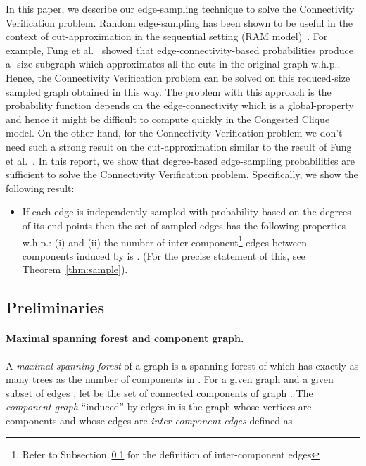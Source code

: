 \documentclass[11pt]{article}
\begin{document}
In this paper, we describe our edge-sampling technique to solve the Connectivity Verification problem. 
Random edge-sampling has been shown to be useful in the context of cut-approximation in the sequential setting (RAM model)~\cite{karger1994stoc, benczurKarger1996stoc, fung2011stoc}. 
For example, Fung et al.~\cite{fung2011stoc} showed that edge-connectivity-based probabilities produce a -size subgraph which approximates all the cuts in the original graph w.h.p..  
Hence, the Connectivity Verification problem can be solved on this reduced-size sampled graph obtained in this way.
The problem with this approach is the probability function depends on the edge-connectivity which is a global-property and hence it might be difficult to compute quickly in the Congested Clique model. 
On the other hand, for the Connectivity Verification problem we don't need such a strong result on the cut-approximation similar to the result of Fung et al.~\cite{fung2011stoc}. 
In this report, we show that degree-based edge-sampling probabilities are sufficient to solve the Connectivity Verification problem. 
Specifically, we show the following result: 
\begin{itemize}
  \item If each edge  is independently sampled with probability based on the degrees of its end-points then the set of sampled edges  has the following properties w.h.p.:
    (i)  and (ii) the number of inter-component\footnote{Refer to Subsection~\ref{sub:tech} for the definition of inter-component edges}  edges between components induced by  is . 
    (For the precise statement of this, see Theorem~\ref{thm:sample}).
\end{itemize}


\subsection{Preliminaries}
\label{sub:tech}
\paragraph{Maximal spanning forest and component graph.}
A \textit{maximal spanning forest} of a graph  is a spanning forest of  which has exactly as many trees as the number of components in .    
  For a given graph  and a given subset of edges , let  be the set of connected components of graph . 
  The \textit{component graph} ``induced'' by edges in  is the graph  whose vertices are components  and whose edges are 
 \textit{inter-component edges} defined as  
 
\end{document}
